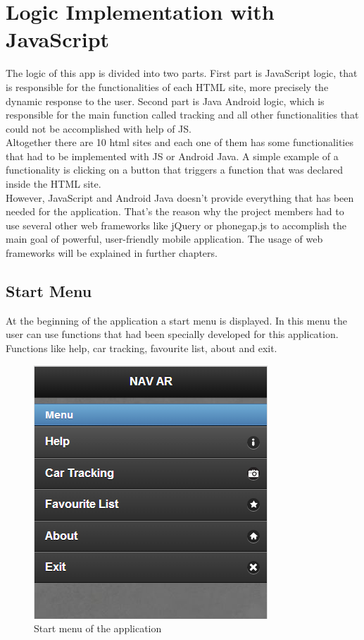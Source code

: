 \chapter{Logic Implementation with JavaScript} \label{chapter:desgin}

The logic of this app is divided into two parts. First part is JavaScript logic, that is responsible for the functionalities of each HTML site, more precisely the dynamic response to the user. Second part is Java Android logic, which is responsible for the main function called tracking and all other functionalities that could not be accomplished with help of JS. 
\\

Altogether there are 10 html sites and each one of them has some functionalities that had to be implemented with JS or Android Java. A simple example of a functionality is clicking on a button that triggers a function that was declared inside the HTML site.
\\

However, JavaScript and Android Java doesn't provide everything that has been needed for the application. That's the reason why the project members had to use several other web frameworks like jQuery or phonegap.js to accomplish the main goal of powerful, user-friendly mobile application. The usage of web frameworks will be explained in further chapters. 

\section{Start Menu}
At the beginning of the application a start menu is displayed. In this menu the user can use functions that had been specially developed for this application. Functions like help, car tracking, favourite list, about and exit.
\\

\begin{figure}
\centering
\includegraphics[width=0.6\linewidth]{graphics/chapter4/1}
\caption{Start menu of the application}
\label{fig:1}
\end{figure}
\newpage

